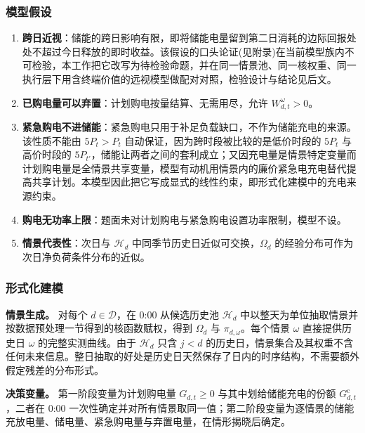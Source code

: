 \subsubsection{模型假设}

\begin{enumerate}
\item \textbf{跨日近视}：储能的跨日影响有限，即将储能电量留到第二日消耗的边际回报处处不超过今日释放的即时收益。该假设的口头论证(见附录)在当前模型族内不可检验，本工作把它改写为待检验命题，并在同一情景池、同一核权重、同一执行层下用含终端价值的远视模型做配对对照，检验设计与结论见后文。
\item \textbf{已购电量可以弃置}：计划购电按量结算、无需用尽，允许 $W_{d,t}^{\omega}>0$。
\item \textbf{紧急购电不进储能}：紧急购电只用于补足负载缺口，不作为储能充电的来源。该性质不能由 $5P_t>P_t$ 自动保证，因为跨时段被比较的是低价时段的 $5P_t$ 与高价时段的 $5P_{t'}$，储能让两者之间的套利成立；又因充电量是情景特定变量而计划购电量是全情景共享变量，模型有动机用情景内的廉价紧急电充电替代提高共享计划。本模型因此把它写成显式的线性约束，即形式化建模中的充电来源约束。
\item \textbf{购电无功率上限}：题面未对计划购电与紧急购电设置功率限制，模型不设。
\item \textbf{情景代表性}：次日与 $\mathcal{H}_d$ 中同季节历史日近似可交换，$\Omega_d$ 的经验分布可作为次日净负荷条件分布的近似。
\end{enumerate}

\subsubsection{形式化建模}

\textbf{情景生成。} 对每个 $d\in\mathcal{D}$，在 0:00 从候选历史池 $\mathcal{H}_d$ 中以整天为单位抽取情景\cite{kaut2007,kaut2021}并按数据预处理一节得到的核函数赋权，得到 $\Omega_d$ 与 $\pi_{d,\omega}$。每个情景 $\omega$ 直接提供历史日 $\omega$ 的完整实测曲线。由于 $\mathcal{H}_d$ 只含 $j<d$ 的历史日，情景集合及其权重不含任何未来信息。整日抽取的好处是历史日天然保存了日内的时序结构，不需要额外假定残差的分布形式。

\textbf{决策变量。} 第一阶段变量为计划购电量 $G_{d,t}\ge0$ 与其中划给储能充电的份额 $G^{\mathrm{c}}_{d,t}$，二者在 0:00 一次性确定并对所有情景取同一值；第二阶段变量为逐情景的储能充放电量、储电量、紧急购电量与弃置电量，在情形揭晓后确定。

